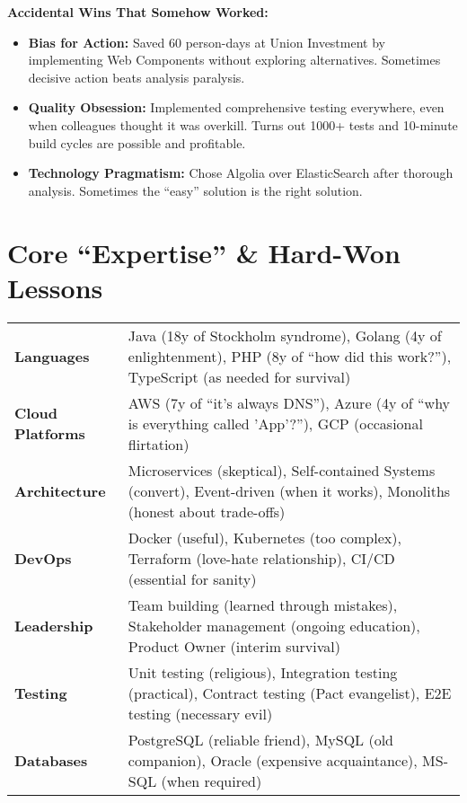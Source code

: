 \documentclass[11pt,a4paper]{article}
\begin{document}
\textbf{Accidental Wins That Somehow Worked:}
\begin{itemize}[nosep,leftmargin=1.5em]
    \item \textbf{Bias for Action:} Saved 60 person-days at Union Investment by implementing Web Components without exploring alternatives. Sometimes decisive action beats analysis paralysis.
    \item \textbf{Quality Obsession:} Implemented comprehensive testing everywhere, even when colleagues thought it was overkill. Turns out 1000+ tests and 10-minute build cycles are possible and profitable.
    \item \textbf{Technology Pragmatism:} Chose Algolia over ElasticSearch after thorough analysis. Sometimes the ``easy'' solution is the right solution.
\end{itemize}

\vspace{0.5em}

\section*{Core ``Expertise'' \& Hard-Won Lessons}

\begin{tabularx}{\textwidth}{>{\bfseries}p{4cm}X}
\textbf{Languages} & Java (18y of Stockholm syndrome), Golang (4y of enlightenment), PHP (8y of ``how did this work?''), TypeScript (as needed for survival) \\
\textbf{Cloud Platforms} & AWS (7y of ``it's always DNS''), Azure (4y of ``why is everything called 'App'?''), GCP (occasional flirtation) \\
\textbf{Architecture} & Microservices (skeptical), Self-contained Systems (convert), Event-driven (when it works), Monoliths (honest about trade-offs) \\
\textbf{DevOps} & Docker (useful), Kubernetes (too complex), Terraform (love-hate relationship), CI/CD (essential for sanity) \\
\textbf{Leadership} & Team building (learned through mistakes), Stakeholder management (ongoing education), Product Owner (interim survival) \\
\textbf{Testing} & Unit testing (religious), Integration testing (practical), Contract testing (Pact evangelist), E2E testing (necessary evil) \\
\textbf{Databases} & PostgreSQL (reliable friend), MySQL (old companion), Oracle (expensive acquaintance), MS-SQL (when required) \\
\end{tabularx}
\end{document}
